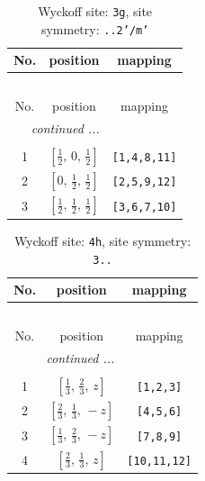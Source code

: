 \documentclass[fleqn,8pt]{jsarticle}
\begin{document}
\begin{longtable}{ccc}
\caption{Wyckoff site: {\tt 3g}, site symmetry: {\tt ..2'/m'}}
 \\
 \hline \hline
No. & position & mapping \\ \hline \endfirsthead

\multicolumn{2}{l}{\tablename\ \thetable{}} \\
 \hline \hline
No. & position & mapping \\ \hline \endhead

 \hline \hline
\multicolumn{2}{r}{\footnotesize\it continued ...} \\ \endfoot

 \hline \hline
\multicolumn{2}{r}{} \\ \endlastfoot

1 & $\left[ \frac{1}{2},\, 0,\, \frac{1}{2} \right]$ & {\tt [1,4,8,11]} \\ \hline
2 & $\left[ 0,\, \frac{1}{2},\, \frac{1}{2} \right]$ & {\tt [2,5,9,12]} \\ \hline
3 & $\left[ \frac{1}{2},\, \frac{1}{2},\, \frac{1}{2} \right]$ & {\tt [3,6,7,10]} \\
\end{longtable}
\renewcommand{\arraystretch}{1.2}
\begin{longtable}{ccc}
\caption{Wyckoff site: {\tt 4h}, site symmetry: {\tt 3..}}
 \\
 \hline \hline
No. & position & mapping \\ \hline \endfirsthead

\multicolumn{2}{l}{\tablename\ \thetable{}} \\
 \hline \hline
No. & position & mapping \\ \hline \endhead

 \hline \hline
\multicolumn{2}{r}{\footnotesize\it continued ...} \\ \endfoot

 \hline \hline
\multicolumn{2}{r}{} \\ \endlastfoot

1 & $\left[ \frac{1}{3},\, \frac{2}{3},\, z \right]$ & {\tt [1,2,3]} \\ \hline
2 & $\left[ \frac{2}{3},\, \frac{1}{3},\, - z \right]$ & {\tt [4,5,6]} \\ \hline
3 & $\left[ \frac{1}{3},\, \frac{2}{3},\, - z \right]$ & {\tt [7,8,9]} \\ \hline
4 & $\left[ \frac{2}{3},\, \frac{1}{3},\, z \right]$ & {\tt [10,11,12]} \\
\end{longtable}
\end{document}
